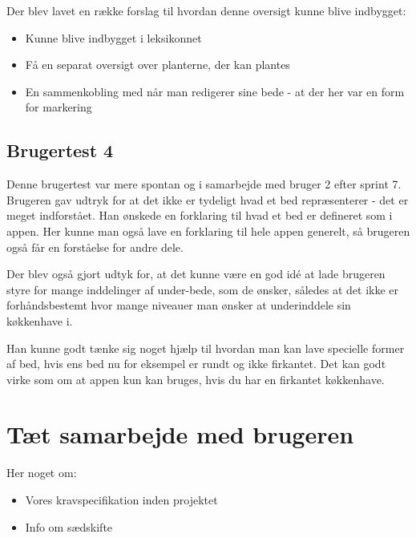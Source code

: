 Der blev lavet en række forslag til hvordan denne oversigt kunne blive indbygget:
\begin{itemize}
    \item Kunne blive indbygget i leksikonnet
    \item Få en separat oversigt over planterne, der kan plantes
    \item En sammenkobling med når man redigerer sine bede - at der her var en form for markering
\end{itemize}

\subsection{Brugertest 4}

Denne brugertest var mere spontan og i samarbejde med bruger 2 efter sprint 7. Brugeren gav udtryk for at det ikke er tydeligt hvad et bed repræsenterer - det er meget indforstået. Han ønskede en forklaring til hvad et bed er defineret som i appen. Her kunne man også lave en forklaring til hele appen generelt, så brugeren også får en forståelse for andre dele.

Der blev også gjort udtyk for, at det kunne være en god idé at lade brugeren styre for mange inddelinger af under-bede, som de ønsker, således at det ikke er forhåndsbestemt hvor mange niveauer man ønsker at underinddele sin køkkenhave i.

Han kunne godt tænke sig noget hjælp til hvordan man kan lave specielle former af bed, hvis ens bed nu for eksempel er rundt og ikke firkantet. Det kan godt virke som om at appen kun kan bruges, hvis du har en firkantet køkkenhave.

\section{Tæt samarbejde med brugeren}
Her noget om:
\begin{itemize}
    \item Vores kravspecifikation inden projektet
    \item Info om sædskifte
\end{itemize} 

